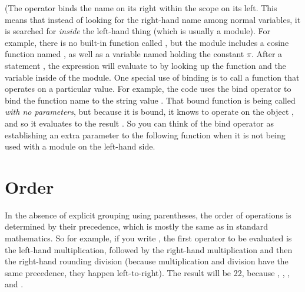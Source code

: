 \documentclass{handout}
\begin{document}
  (The  operator binds the name on its right within the scope on its left. This means that instead of looking for the right-hand name among normal variables, it is searched for \emph{inside} the left-hand thing (which is usually a module). For example, there is no built-in function called , but the  module includes a cosine function named , as well as a variable named  holding the constant $\pi$. After a statement , the expression  will evaluate to  by looking up the  function and the  variable inside of the  module. One special use of binding is to call a function that operates on a particular value. For example, the code  uses the bind operator to bind the function name  to the string value . That bound function is being called \emph{with no parameters}, but because it is bound, it knows to operate on the object , and so it evaluates to the result . So you can think of the bind operator as establishing an extra parameter to the following function when it is not being used with a module on the left-hand side.


\section{Order}

In the absence of explicit grouping using parentheses, the order of operations is determined by their precedence, which is mostly the same as in standard mathematics. So for example, if you write , the first operator to be evaluated is the left-hand multiplication, followed by the right-hand multiplication and then the right-hand rounding division (because multiplication and division have the same precedence, they happen left-to-right). The result will be 22, because , , , and .

\end{document}
